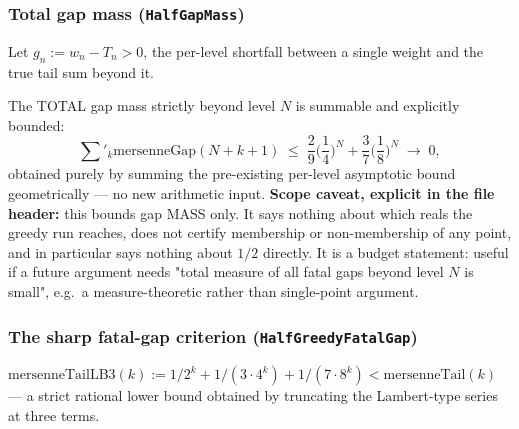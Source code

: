 \subsubsection*{Total gap mass (\texttt{HalfGapMass})}

\begin{defn}
Let $g_n:=w_n-T_n>0$, the
per-level shortfall between a single weight and the true tail sum beyond it.
\par\noindent{}    
\end{defn}

\begin{thm}
The TOTAL gap mass strictly beyond level $N$ is summable and explicitly bounded:
\[
\sum\nolimits'_{k} \mathrm{mersenneGap}(N+k+1) \;\le\; \frac29\Big(\frac14\Big)^N + \frac37\Big(\frac18\Big)^N \;\longrightarrow\; 0,
\]
obtained purely by summing the pre-existing per-level asymptotic bound geometrically — no new
arithmetic input. \textbf{Scope caveat, explicit in the file header:} this bounds gap MASS only.
It says nothing about which reals the greedy run reaches, does not certify membership or
non-membership of any point, and in particular says nothing about $1/2$ directly. It is a
budget statement: useful if a future argument needs "total measure of all fatal gaps beyond
level $N$ is small", e.g.\ a measure-theoretic rather than single-point argument.
\par\noindent{}      
\end{thm}

\subsubsection*{The sharp fatal-gap criterion (\texttt{HalfGreedyFatalGap})}

\begin{defn}
$\mathrm{mersenneTailLB3}(k) := 1/2^k + 1/(3\cdot4^k) + 1/(7\cdot8^k) < \mathrm{mersenneTail}(k)$
— a strict rational lower bound obtained by truncating the Lambert-type series at three terms.
\par\noindent{}     
\end{defn}

